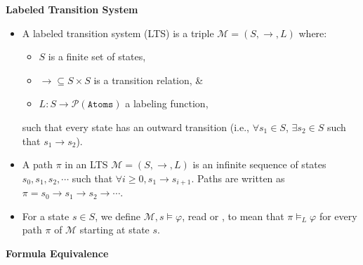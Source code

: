 \documentclass[12pt]{article}
\begin{document}
    \textbf{Labeled Transition System}

    \begin{itemize}
        \item A labeled transition system (LTS) is a triple $\mathcal{M} = (S, \rightarrow, L)$ where:
        \begin{itemize}
            \item $S$ is a finite set of states, 
            \item ${\rightarrow} \subseteq S \times S$ is a transition relation, \& 
            \item $L: S \rightarrow \mathcal{P}(\texttt{Atoms})$ a labeling function,
        \end{itemize}
        such that every state has an outward transition (i.e., $\forall{s_1} \in S$, $\exists{s_2} \in S$ such that $s_1 \rightarrow s_2$).
        \item A path $\pi$ in an LTS $\mathcal{M} = (S, \rightarrow, L)$ is an infinite sequence of states $s_0, s_1, s_2, \cdots$ such that $\forall{i} \geq 0, s_1 \rightarrow s_{i+1}$.
        Paths are written as $\pi = s_0 \rightarrow s_1 \rightarrow s_2 \rightarrow \cdots$.
        \item For a state $s \in S$, we define $\mathcal{M}, s \models \varphi$, read  or , to mean that $\pi \models_L \varphi$ for every path $\pi$ of $\mathcal{M}$ starting at state $s$.
    \end{itemize}

    \textbf{Formula Equivalence}
\end{document}
